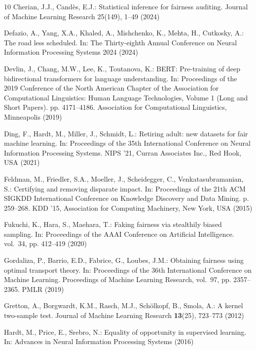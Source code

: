 \documentclass[runningheads, orivec]{llncs}
\begin{document}
\begin{thebibliography}{10}
Cherian, J.J., Cand{{\`e}}s, E.J.: Statistical inference for fairness auditing. Journal of Machine Learning Research  25(149),  1--49 (2024)

Defazio, A., Yang, X.A., Khaled, A., Mishchenko, K., Mehta, H., Cutkosky, A.: The road less scheduled. In: The Thirty-eighth Annual Conference on Neural Information Processing Systems 2024 (2024)

Devlin, J., Chang, M.W., Lee, K., Toutanova, K.: {BERT}: Pre-training of deep bidirectional transformers for language understanding. In: Proceedings of the 2019 Conference of the North {A}merican Chapter of the Association for Computational Linguistics: Human Language Technologies, Volume 1 (Long and Short Papers). pp. 4171--4186. Association for Computational Linguistics, Minneapolis (2019)

Ding, F., Hardt, M., Miller, J., Schmidt, L.: Retiring adult: new datasets for fair machine learning. In: Proceedings of the 35th International Conference on Neural Information Processing Systems. NIPS '21, Curran Associates Inc., Red Hook, USA (2021)

Feldman, M., Friedler, S.A., Moeller, J., Scheidegger, C., Venkatasubramanian, S.: Certifying and removing disparate impact. In: Proceedings of the 21th ACM SIGKDD International Conference on Knowledge Discovery and Data Mining. p. 259–268. KDD '15, Association for Computing Machinery, New York, USA (2015)

Fukuchi, K., Hara, S., Maehara, T.: Faking fairness via stealthily biased sampling. In: Proceedings of the AAAI Conference on Artificial Intelligence. vol.~34, pp. 412--419 (2020)

Gordaliza, P., Barrio, E.D., Fabrice, G., Loubes, J.M.: Obtaining fairness using optimal transport theory. In: Proceedings of the 36th International Conference on Machine Learning. Proceedings of Machine Learning Research, vol.~97, pp. 2357--2365. PMLR (2019)

Gretton, A., Borgwardt, K.M., Rasch, M.J., Sch{{\"o}}lkopf, B., Smola, A.: A kernel two-sample test. Journal of Machine Learning Research  \textbf{13}(25), 723--773 (2012)

Hardt, M., Price, E., Srebro, N.: Equality of opportunity in supervised learning. In: Advances in Neural Information Processing Systems (2016)


\end{thebibliography}
\end{document}
